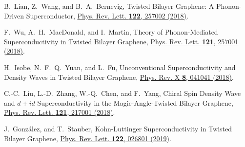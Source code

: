\documentclass[twocolumn,english,prl,floatfix,citeautoscript,nofootinbib]{revtex4}
\begin{document}
\begin{widetext}
\begin{thebibliography}{99}
 B.~Lian, Z.~Wang, and B.~A.~Bernevig,
Twisted Bilayer Graphene: A Phonon-Driven Superconductor, \href{https://doi.org/10.1103/PhysRevLett.122.257002}%
{Phys. Rev. Lett. \textbf{122}, 257002 (2018)}.

 F.~Wu, A.~H.~MacDonald, and I.~Martin,
Theory of Phonon-Mediated Superconductivity in Twisted Bilayer Graphene,
\href{https://doi.org/10.1103/PhysRevLett.121.257001}{Phys. Rev. Lett.
\textbf{121}, 257001 (2018)}.

 H.~Isobe, N.~F.~Q.~Yuan, and L.~Fu,
Unconventional Superconductivity and Density Waves in Twisted Bilayer
Graphene, \href{https://doi.org/10.1103/PhysRevX.8.041041}{Phys. Rev. X
\textbf{8}, 041041 (2018)}.

 C.-C.~Liu, L.-D.~Zhang, W.-Q.~Chen, and
F.~Yang, Chiral Spin Density Wave and $d+id$ Superconductivity in the
Magic-Angle-Twisted Bilayer Graphene, \href{https://doi.org/10.1103/PhysRevLett.121.217001}%
{Phys. Rev. Lett. \textbf{121}, 217001 (2018)}.

 J.~Gonz\'alez, and T.~Stauber,
Kohn-Luttinger Superconductivity in Twisted Bilayer Graphene, \href{https://doi.org/10.1103/PhysRevLett.122.026801}%
{Phys. Rev. Lett. \textbf{122}, 026801 (2019)}.
\end{thebibliography}

\end{widetext}
\end{document}
